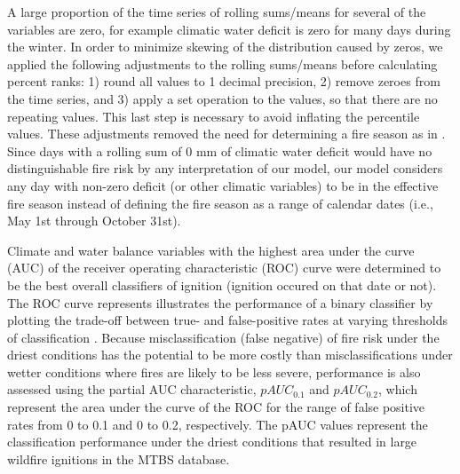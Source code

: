 \documentclass[11pt]{article}
\begin{document}
A large proportion of the time series of rolling sums/means for several of the variables are zero, for example climatic water deficit is zero for many days during the winter.  %
In order to minimize skewing of the distribution caused by zeros, we applied the following adjustments to the rolling sums/means before calculating percent ranks: 1) round all values to 1 decimal precision, 2) remove zeroes from the time series, and 3) apply a set operation to the values, so that there are no repeating values.  This last step is necessary to avoid inflating the percentile values. These adjustments %
removed the need for determining a fire season as in \citet{thomaWaterBalanceIndicator2020}.  Since days with a rolling sum of 0 mm of climatic water deficit would have no distinguishable fire risk by any interpretation of our model, our model considers any day with non-zero deficit (or other climatic variables) to be in the effective fire season instead of defining the fire season as a range of calendar dates (i.e., May 1st through October 31st).

Climate and water balance variables with the highest area under the curve (AUC) of the receiver operating characteristic (ROC) curve were determined to be the best overall classifiers of ignition (ignition occured on that date or not).  The ROC curve represents illustrates the performance of a binary classifier by plotting the trade-off between true- and false-positive rates at varying thresholds of classification \citep{pontiusRecommendationsUsingRelative2014}. Because misclassification (false negative) of fire risk under the driest conditions has the potential to be more costly than misclassifications under wetter conditions where fires are likely to be less severe, performance is also assessed using the partial AUC characteristic, $pAUC_{0.1}$ and $pAUC_{0.2}$, which represent the area under the curve of the ROC for the range of false positive rates from 0 to 0.1 and 0 to 0.2, respectively. The pAUC values represent the classification performance under the driest conditions that resulted in large wildfire ignitions in the MTBS database.   
\end{document}
